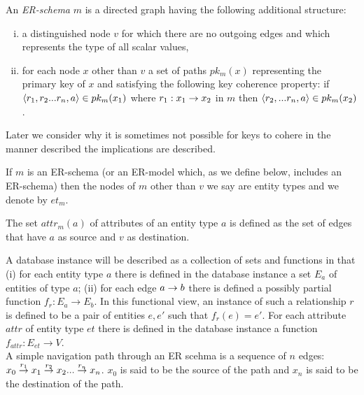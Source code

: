 \documentclass[10pt,a4paper]{article}
\newcommand{\genericmodel}{\mathcal{M}}
\renewcommand{\genericmodel}{{m}}
\newcommand{\veee}{v}
\newcommand{\Veee}{V}
\newcommand{\et}[1][\genericmodel]{et_{#1}}
\newcommand{\attr}[2] [\genericmodel]{attr_{#1}(#2)}
\newcommand{\pk}[2] [\genericmodel]{pk_{#1}(#2)}
\newcommand{\term}[1]{\textit{{#1}}}
\begin{document}
\begin{definition}
An \term{ER-schema} $\genericmodel$ is a directed graph having the following additional structure:

\begin{enumerate} [(i)]
\item{a distinguished node $\veee$ for which there are no outgoing edges and which represents the type of all scalar values, }

\item{for each node $x$ other than $\veee$  a set  of paths $\pk{x} $  
representing the primary key of $x$ and satisfying the following key coherence property:
if $\tuple{r_1,r_2...r_n,a} \in \pk{x_1}$  where $r_1:x_1 \rightarrow x_2$ in $\genericmodel$ 
then $\tuple{r_2,...r_n,a} \in \pk{x_2}$.
}
\end{enumerate}

\end{definition}
Later we consider why it is sometimes not possible for keys to cohere in the manner described the
implications are described. 

If $\genericmodel$ is an ER-schema (or an ER-model which, as we define below, 
includes an ER-schema) then the nodes of $\genericmodel$ other than $\veee$ we say are entity types and we denote by $\et$.

The set $\attr{a}$ of attributes of an entity type $a$ is defined as the set of edges that have $a$ as source and  $\veee$ as destination. 




\noindent A
database instance will be described as a collection of sets 
and functions in that (i) for each entity type $a$ there is defined in 
the database instance a set $E_a$ of entities of type $a$;
(ii) for each edge $a \rightarrow b$
there is defined a possibly partial function $f_r : E_a \rightarrow E_b$. 
In this functional view, an instance of such a relationship $r$ is defined to be a pair 
of entities $e,e'$ such that $f_r(e)=e'$. For each attribute $attr$
of entity type $et$ there is defined in the database instance a function
$f_{attr}: E_{et} \rightarrow \Veee$. \\

\noindent A simple navigation path through an ER scehma  is a
sequence of  $n$ edges:
$\overset{r_1}{x_0 \rightarrow   x_1} \overset{r_2}{\rightarrow} x_2 ... \overset{r_n}{\rightarrow} x_n$.  $x_0$ is said to be the source of the path and $x_n$ is said to be the destination of the path. 
\end{document}
